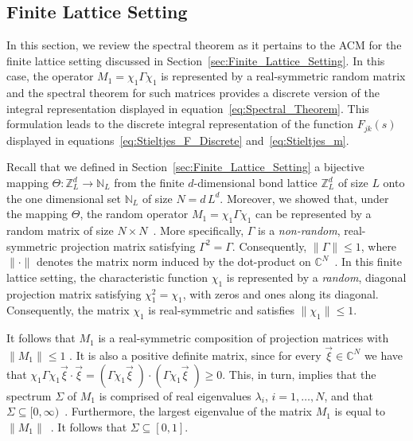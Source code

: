 \documentclass{cmslatex}
\begin{document}
\subsection{Finite Lattice Setting}
\label{sec:The_Spectral_Theorem_Finite_Lattice}
%
In this section, we review the spectral theorem as it pertains to the
ACM for the finite lattice setting discussed in
Section~\ref{sec:Finite_Lattice_Setting}. In this case, the operator 
$M_1=\chi_1\Gamma\chi_1$ is represented by a real-symmetric random matrix and the
spectral theorem for such matrices provides a discrete version of the
integral representation displayed in
equation~\eqref{eq:Spectral_Theorem}. This formulation leads to the
discrete integral representation of the function $F_{jk}(s)$ displayed in
equations~\eqref{eq:Stieltjes_F_Discrete} and~\eqref{eq:Stieltjes_m}.   



Recall that we defined in Section~\ref{sec:Finite_Lattice_Setting} a
bijective mapping $\Theta:\mathbb{Z}_L^d\to\mathbb{N}_L$ from the finite
$d$-dimensional bond lattice $\mathbb{Z}_L^d$ of size $L$ onto the
one dimensional set $\mathbb{N}_L$ of size $N=d\,L^d$. Moreover, we
showed that, under the mapping $\Theta$, the random operator $M_1=\chi_1\Gamma\chi_1$
can be represented by a random matrix of size
$N\times N$~\cite{Golden:JBM:337,Murphy:JMP:063506}. More specifically, $\Gamma$   
is a \emph{non-random}, real-symmetric projection matrix  satisfying
$\Gamma^2=\Gamma$. Consequently, $\|\Gamma\|\leq1$, where $\|\cdot\|$ denotes the matrix norm
induced by the dot-product on $\mathbb{C}^N$~\cite{Demmel:1997}. In
this finite lattice setting, the characteristic 
function $\chi_1$ is represented by a \emph{random}, diagonal projection
matrix satisfying $\chi_1^2=\chi_1$, with zeros and ones along its
diagonal. Consequently, the matrix $\chi_1$ is real-symmetric and satisfies
$\|\chi_1\|\leq1$. 



It follows that $M_1$ is a real-symmetric composition of projection
matrices with $\|M_1\|\leq1$ \cite{Demmel:1997}. It is also a positive
definite matrix, since for every $\vec{\xi}\in\mathbb{C}^N$ we have that
$\chi_1\Gamma\chi_1\vec{\xi}\cdot\vec{\xi}=(\Gamma\chi_1\vec{\xi}\;)\cdot(\Gamma\chi_1\vec{\xi}\;)\geq0$. This, in
turn, implies that the spectrum $\Sigma$ of $M_1$ is comprised of real
eigenvalues $\lambda_i$, $i=1,\ldots,N$, and that
$\Sigma\subseteq[0,\infty)$~\cite{Horn_Johnson-1990}. Furthermore, the largest
eigenvalue of the matrix $M_1$ is equal to
$\|M_1\|$~\cite{Demmel:1997}. It follows that $\Sigma\subseteq[0,1]$.    
\end{document}
